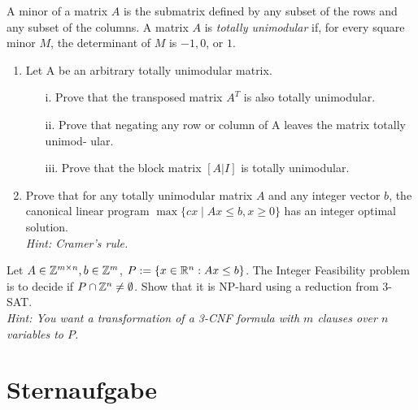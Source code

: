 \documentclass{uebung_cs}
\begin{document}
\begin{aufgabe}
	A minor of a matrix $A$ is the submatrix defined by any subset of the rows and any subset of the columns. A matrix $A$ is \emph{totally unimodular} if, for every square minor $M$, the determinant of $M$ is $−1, 0$, or $1$.
	\begin{enumerate}
		\item Let A be an arbitrary totally unimodular matrix.
		\begin{itemize}
			\item[i.] Prove that the transposed matrix $A^T$ is also totally unimodular.
			\item[ii.] Prove that negating any row or column of A leaves the matrix totally unimod- ular.
			\item[iii.] Prove that the block matrix $[A | I ]$ is totally unimodular.
		\end{itemize}
		\item Prove that for any totally unimodular matrix $A$ and any integer vector $b$, the canonical linear program $\max\{cx  \; | \; Ax \leq b, x \geq 0\}$ has an integer optimal solution. \\
		\emph{Hint: Cramer’s rule.}
	\end{enumerate}
\end{aufgabe}

\begin{aufgabe}
	Let $A \in \mathbb{Z}^{m\times n}, b \in \mathbb{Z}^m$, $P := \{x \in \mathbb{R}^n : Ax \leq b \}$.
	The Integer Feasibility problem is to decide if $P \cap \mathbb{Z}^n \neq \emptyset$.
	Show that it is NP-hard using a reduction from 3-SAT. \\
	\emph{Hint: You want a transformation of a 3-CNF formula with $m$ clauses over $n$ variables to $P$.}
\end{aufgabe}


\section*{Sternaufgabe}

\begin{aufgabe}
\end{aufgabe}
\end{document}
